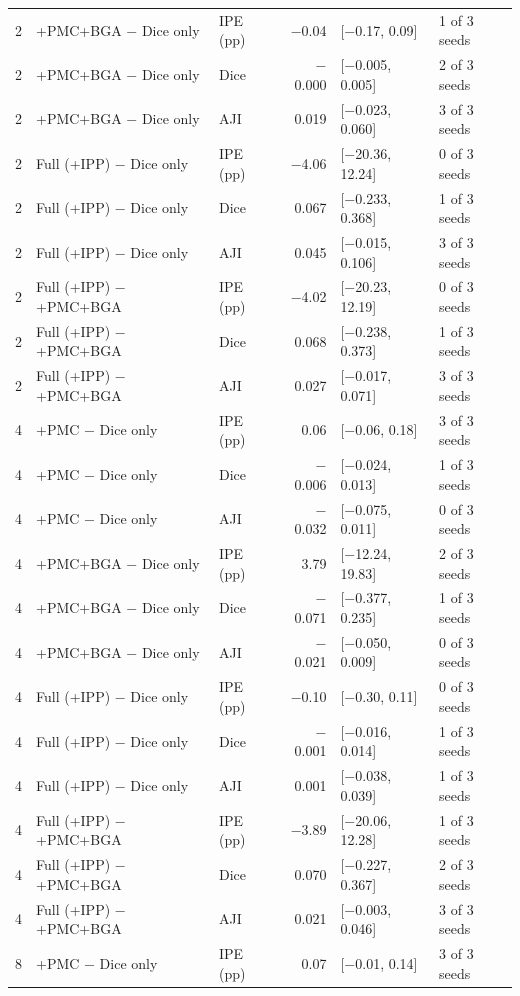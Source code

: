 \documentclass[10pt]{article}
\begin{document}
\begin{landscape}
{\begin{longtable}{r l l r l l}
2 & +PMC+BGA $-$ Dice only & IPE (pp) & $-$0.04 & [$-$0.17, 0.09] & 1 of 3 seeds \\
2 & +PMC+BGA $-$ Dice only & Dice & $-$0.000 & [$-$0.005, 0.005] & 2 of 3 seeds \\
2 & +PMC+BGA $-$ Dice only & AJI & 0.019 & [$-$0.023, 0.060] & 3 of 3 seeds \\
2 & Full (+IPP) $-$ Dice only & IPE (pp) & $-$4.06 & [$-$20.36, 12.24] & 0 of 3 seeds \\
2 & Full (+IPP) $-$ Dice only & Dice & 0.067 & [$-$0.233, 0.368] & 1 of 3 seeds \\
2 & Full (+IPP) $-$ Dice only & AJI & 0.045 & [$-$0.015, 0.106] & 3 of 3 seeds \\
2 & Full (+IPP) $-$ +PMC+BGA & IPE (pp) & $-$4.02 & [$-$20.23, 12.19] & 0 of 3 seeds \\
2 & Full (+IPP) $-$ +PMC+BGA & Dice & 0.068 & [$-$0.238, 0.373] & 1 of 3 seeds \\
2 & Full (+IPP) $-$ +PMC+BGA & AJI & 0.027 & [$-$0.017, 0.071] & 3 of 3 seeds \\
4 & +PMC $-$ Dice only & IPE (pp) & 0.06 & [$-$0.06, 0.18] & 3 of 3 seeds \\
4 & +PMC $-$ Dice only & Dice & $-$0.006 & [$-$0.024, 0.013] & 1 of 3 seeds \\
4 & +PMC $-$ Dice only & AJI & $-$0.032 & [$-$0.075, 0.011] & 0 of 3 seeds \\
4 & +PMC+BGA $-$ Dice only & IPE (pp) & 3.79 & [$-$12.24, 19.83] & 2 of 3 seeds \\
4 & +PMC+BGA $-$ Dice only & Dice & $-$0.071 & [$-$0.377, 0.235] & 1 of 3 seeds \\
4 & +PMC+BGA $-$ Dice only & AJI & $-$0.021 & [$-$0.050, 0.009] & 0 of 3 seeds \\
4 & Full (+IPP) $-$ Dice only & IPE (pp) & $-$0.10 & [$-$0.30, 0.11] & 0 of 3 seeds \\
4 & Full (+IPP) $-$ Dice only & Dice & $-$0.001 & [$-$0.016, 0.014] & 1 of 3 seeds \\
4 & Full (+IPP) $-$ Dice only & AJI & 0.001 & [$-$0.038, 0.039] & 1 of 3 seeds \\
4 & Full (+IPP) $-$ +PMC+BGA & IPE (pp) & $-$3.89 & [$-$20.06, 12.28] & 1 of 3 seeds \\
4 & Full (+IPP) $-$ +PMC+BGA & Dice & 0.070 & [$-$0.227, 0.367] & 2 of 3 seeds \\
4 & Full (+IPP) $-$ +PMC+BGA & AJI & 0.021 & [$-$0.003, 0.046] & 3 of 3 seeds \\
8 & +PMC $-$ Dice only & IPE (pp) & 0.07 & [$-$0.01, 0.14] & 3 of 3 seeds \\

\end{longtable}}
\end{landscape}
\end{document}
